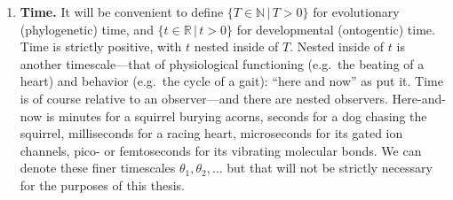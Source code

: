 \begin{enumerate}

    \item \textbf{Time.} It will be convenient to define $\{T\in\mathbb{N} \,|\, T>0\}$ for evolutionary (phylogenetic) time, and $\{t\in\mathbb{R} \,|\, t>0\}$ for developmental (ontogentic) time.
    Time is strictly positive, with $t$ nested inside of $T$.
    Nested inside of $t$ is another timescale---that of physiological functioning (e.g.~the beating of a heart) and behavior (e.g.~the cycle of a gait):
    ``here and now'' as \citet{pfeifer2006body} put it.
    Time is of course relative to an observer---and there are nested observers.
    Here-and-now is minutes for a squirrel burying acorns, seconds for a dog chasing the squirrel, milliseconds for a racing heart, microseconds for its gated ion channels, pico- or femtoseconds for its vibrating molecular bonds.
    We can denote these finer timescales $\theta_1, \theta_2, \ldots$
    but that will not be strictly necessary for the purposes of this thesis.
    

\end{enumerate}

